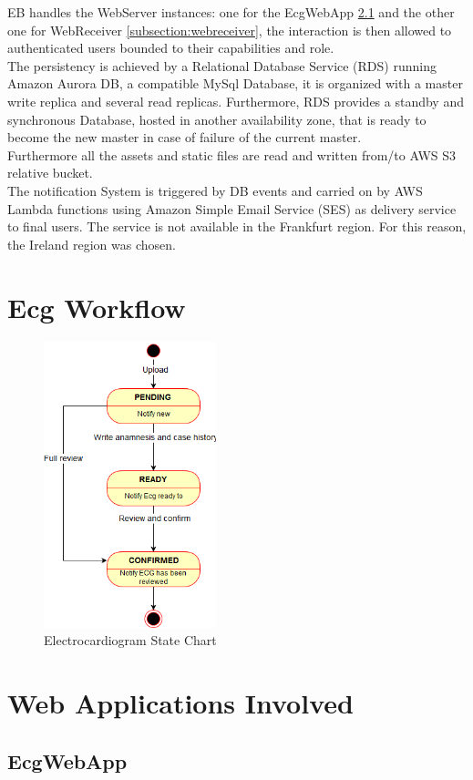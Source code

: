 EB handles the WebServer instances: one for the EcgWebApp \ref{subsection:ecgwebapp} and the other one for WebReceiver \ref{subsection:webreceiver}, the interaction is then allowed to authenticated users bounded to their capabilities and role.\\
The persistency is achieved by a Relational Database Service (RDS) running Amazon Aurora DB, a compatible MySql Database, it is organized with a master write replica and several read replicas.
Furthermore, RDS provides a standby and synchronous Database, hosted in another availability zone, that is ready to become the new master in case of failure of the current master.\\
Furthermore all the assets and static files are read and written from/to AWS S3 relative bucket.\\
The notification System is triggered by DB events and carried on by AWS Lambda functions using Amazon Simple Email Service (SES) as delivery service to final users. The service is not available in the Frankfurt region. For this reason, the Ireland region was chosen.


\section{Ecg Workflow}
\begin{figure}[h]
    \includegraphics[width=5cm]{ECGstatechart}
    \caption{Electrocardiogram State Chart}
    \label{fig:ECGstatechart}
\end{figure}
\section{Web Applications Involved}
\subsection{EcgWebApp}
\label{subsection:ecgwebapp}
